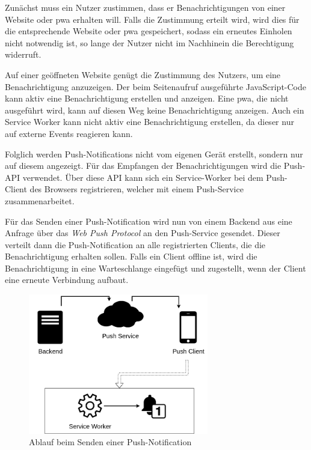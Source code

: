\documentclass[12pt, parskip=half]{scrartcl}       %
\begin{document}
Zunächst muss ein Nutzer zustimmen, dass er Benachrichtigungen von einer Website oder \ac{pwa} erhalten will.
Falls die Zustimmung erteilt wird, wird dies für die entsprechende Website oder \ac{pwa} gespeichert, sodass ein erneutes Einholen nicht notwendig ist, so lange der Nutzer nicht im Nachhinein die Berechtigung widerruft.

Auf einer geöffneten Website genügt die Zustimmung des Nutzers, um eine Benachrichtigung anzuzeigen.
Der beim Seitenaufruf ausgeführte JavaScript-Code kann aktiv eine Benachrichtigung erstellen und anzeigen.
Eine \ac{pwa}, die nicht ausgeführt wird, kann auf diesen Weg keine Benachrichtigung anzeigen.
Auch ein Service Worker kann nicht aktiv eine Benachrichtigung erstellen, da dieser nur auf externe Events reagieren kann.

Folglich werden Push-Notifications nicht vom eigenen Gerät erstellt, sondern nur auf diesem angezeigt.
Für das Empfangen der Benachrichtigungen wird die Push-API\cite{w3c_pushapi} verwendet.
Über diese API kann sich ein Service-Worker bei dem Push-Client des Browsers registrieren, welcher mit einem Push-Service zusammenarbeitet.

Für das Senden einer Push-Notification wird nun von einem Backend aus eine Anfrage über das \textit{Web Push Protocol}\cite{ietf_webpush} an den Push-Service gesendet.
Dieser verteilt dann die Push-Notification an alle registrierten Clients, die die Benachrichtigung erhalten sollen.
Falls ein Client offline ist, wird die Benachrichtigung in eine Warteschlange eingefügt und zugestellt, wenn der Client eine erneute Verbindung aufbaut\cite{googledev_webpush}.

\begin{figure}[h]
  \centering
  \includegraphics[width=0.7\textwidth]{src/Push-API.png}
  \caption{Ablauf beim Senden einer Push-Notification}
  \label{fig:push_api}
\end{figure}
\end{document}
